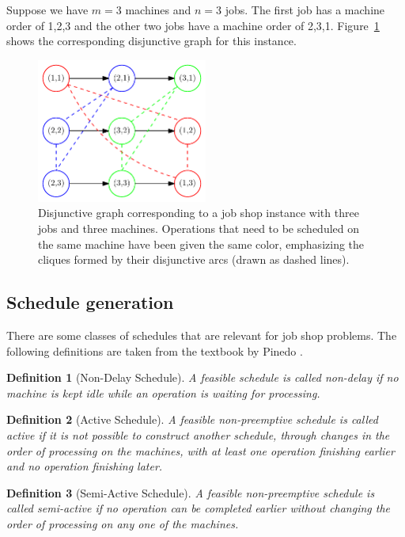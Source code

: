 \documentclass{article}
\theoremstyle{definition}
\theoremstyle{plain}
\newtheorem{define}{Definition}[section]
\begin{document}
Suppose we have $m=3$ machines and $n=3$ jobs. The first job has a machine order of 1,2,3 and the other two jobs have a machine order of 2,3,1.
Figure~\ref{fig:disjunctive-graph-example} shows the corresponding disjunctive graph for this instance.

\begin{figure}[t]
  \centering
  \includegraphics[width=0.5\textwidth]{figures/disjunctive-graph.pdf}
  \caption{Disjunctive graph corresponding to a job shop instance with three
    jobs and three machines. Operations that need to be scheduled on the same
    machine have been given the same color, emphasizing the cliques formed by
    their disjunctive arcs (drawn as dashed lines).}
  \label{fig:disjunctive-graph-example}
\end{figure}


\subsection{Schedule generation}
There are some classes of schedules that are relevant for job shop problems. The
following definitions are taken from the textbook by Pinedo
\cite{pinedoSchedulingTheoryAlgorithms2016}.

\begin{define}[Non-Delay Schedule]
A feasible schedule is called non-delay if no
machine is kept idle while an operation is waiting for processing.
\end{define}

\begin{define}[Active Schedule]
A feasible non-preemptive schedule is called active if
it is not possible to construct another schedule, through changes in the order
of processing on the machines, with at least one operation finishing earlier and
no operation finishing later.
\end{define}

\begin{define}[Semi-Active Schedule]
A feasible non-preemptive schedule is called
semi-active if no operation can be completed earlier without changing the order
of processing on any one of the machines.
\end{define}
\end{document}
